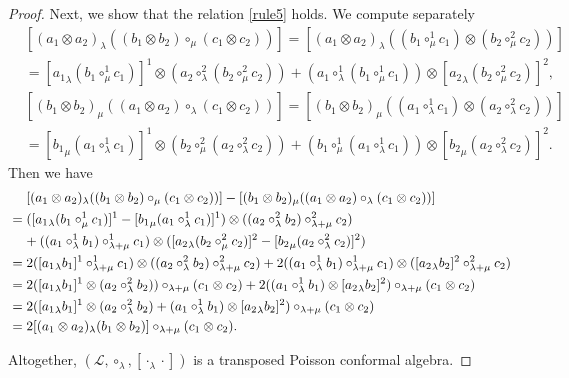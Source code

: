 \documentclass[11pt,letterpaper,reqno]{amsart}
\theoremstyle{definition}
\numberwithin{equation}{section}
\begin{document}
\begin{proof}
Next, we show that the relation \eqref{rule5} holds. We compute separately %
\begin{align*}
&[(a_1\otimes a_2)_\lambda ((b_1\otimes b_2)\circ_\mu (c_1\otimes c_2))]
=[(a_1\otimes a_2)_\lambda ((b_1\circ^{1}_\mu c_1)\otimes (b_2\circ^{2}_\mu c_2))]\\
&=[{a_1}_{\lambda}(b_1\circ^{1}_\mu c_1)]^{1}\otimes (a_2\circ^{2}_\lambda (b_2\circ^{2}_\mu c_2))+(a_1\circ^{1}_\lambda (b_1\circ^{1}_\mu c_1))\otimes [{a_2}_{\lambda}(b_2\circ^{2}_\mu c_2)]^{2},\\
&[(b_1\otimes b_2)_\mu ((a_1\otimes a_2)\circ_\lambda (c_1\otimes c_2))]
=[(b_1\otimes b_2)_\mu ((a_1\circ^{1}_\lambda c_1)\otimes (a_2\circ^{2}_\lambda c_2))]\\
&=[{b_1}_{\mu}(a_1\circ^{1}_\lambda c_1)]^{1}\otimes (b_2\circ^{2}_\mu (a_2\circ^{2}_\lambda c_2))+(b_1\circ^{1}_\mu (a_1\circ^{1}_\lambda c_1))\otimes [{b_2}_{\mu}(a_2\circ^{2}_\lambda c_2)]^{2}.
\end{align*}
Then we have %
\begin{align*}
&\quad \ [(a_1\otimes a_2)_\lambda ((b_1\otimes b_2)\circ_\mu (c_1\otimes c_2))]-[(b_1\otimes b_2)_\mu ((a_1\otimes a_2)\circ_\lambda (c_1\otimes c_2))]\\
&=([{a_1}_{\lambda}(b_1\circ^{1}_\mu c_1)]^{1}-[{b_1}_{\mu}(a_1\circ^{1}_\lambda c_1)]^{1})\otimes ((a_2\circ^{2}_\lambda b_2)\circ^{2}_{\lambda+\mu} c_2)\\
&\hphantom{=~}+((a_1\circ^{1}_\lambda b_1)\circ^{1}_{\lambda+\mu} c_1)\otimes ([{a_2}_{\lambda}(b_2\circ^{2}_\mu c_2)]^{2}-[{b_2}_{\mu}(a_2\circ^{2}_\lambda c_2)]^{2})\\
&=2([{a_1}_{\lambda}b_1]^{1}\circ^1_{\lambda+\mu}c_1)\otimes ((a_2\circ^{2}_\lambda b_2)\circ^{2}_{\lambda+\mu} c_2)
+2((a_1\circ^{1}_\lambda b_1)\circ^{1}_{\lambda+\mu} c_1)\otimes ([{a_2}_{\lambda}b_2]^{2}\circ^2_{\lambda+\mu}c_2)\\
&=2([{a_1}_{\lambda}b_1]^{1}\otimes (a_2\circ^{2}_\lambda b_2))\circ_{\lambda+\mu} (c_1\otimes c_2)
+2((a_1\circ^{1}_\lambda b_1)\otimes [{a_2}_{\lambda}b_2]^{2})\circ_{\lambda+\mu} (c_1\otimes c_2)\\
&=2([{a_1}_{\lambda}b_1]^{1}\otimes (a_2\circ^{2}_\lambda b_2)+(a_1\circ^{1}_\lambda b_1)\otimes [{a_2}_{\lambda}b_2]^{2})\circ_{\lambda+\mu} (c_1\otimes c_2)\\
&=2[(a_1\otimes a_2)_\lambda (b_1\otimes b_2)]\circ_{\lambda+\mu} (c_1\otimes c_2).
\end{align*}

Altogether, $(\mathcal L,\circ_\lambda,[\cdot_\lambda\cdot])$ is a transposed Poisson conformal algebra.
\end{proof}
\end{document}
